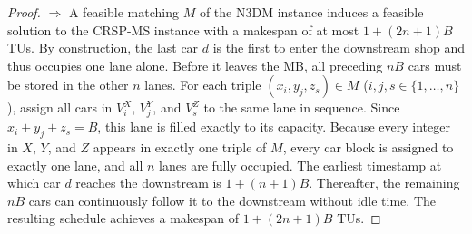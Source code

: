 \documentclass[12pt]{article}
\begin{document}
\begin{proof}
    $\Longrightarrow$ A feasible matching $M$ of the N3DM instance induces a feasible solution to the CRSP-MS instance with a makespan of at most $1+(2n+1)B$ TUs. By construction, the last car $d$ is the first to enter the downstream shop and thus occupies one lane alone. Before it leaves the MB, all preceding $nB$ cars must be stored in the other $n$ lanes. For each triple $(x_i,y_j,z_s)\in M$ ($i,j,s\in \{1,\dots,n\}$), assign all cars in $V^X_i$, $V^Y_j$, and $V^Z_s$ to the same lane in sequence. Since $x_i+y_j+z_s=B$, this lane is filled exactly to its capacity. Because every integer in $X$, $Y$, and $Z$ appears in exactly one triple of $M$, every car block is assigned to exactly one lane, and all $n$ lanes are fully occupied. The earliest timestamp at which car $d$ reaches the downstream is $1+(n+1)B$. Thereafter, the remaining $nB$ cars can continuously follow it to the downstream without idle time. The resulting schedule achieves a makespan of $1+(2n+1)B$ TUs.




\end{proof}
\end{document}
